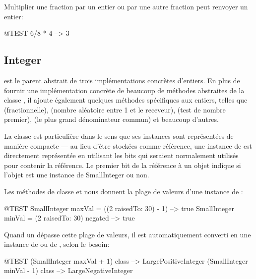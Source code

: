 \documentclass[a4paper,10pt,twoside]{book}
\begin{document}
Multiplier une fraction par un entier ou par une autre fraction peut renvoyer un entier:

\begin{code}{@TEST}
6/8 * 4 --> 3
\end{code}


\subsection{Integer}

 est le parent abstrait de trois implémentations
concrètes d'entiers. En plus de fournir une implémentation
concrète de beaucoup de méthodes abstraites de la classe
, il ajoute également quelques méthodes spécifiques
aux entiers, telles que 
(fractionnelle),
(nombre aléatoire entre 1 et le receveur),
(test de nombre premier), 
(le plus grand dénominateur commun)
et beaucoup d'autres.

La classe  est particulière dans le sens que ses instances sont représentées de manière compacte --- au lieu d'être stockées comme référence, une instance de  est directement représentée en utilisant les bits qui seraient normalement utilisés pour contenir la référence.  Le premier bit de la référence à un objet indique si l'objet est une instance de SmallInteger ou non.

Les méthodes de classe  et  nous donnent la plage de valeurs d'une instance de :

\begin{code}{@TEST}
SmallInteger maxVal = ((2 raisedTo: 30) - 1)      --> true
SmallInteger minVal = (2 raisedTo: 30) negated --> true
\end{code}

Quand un  dépasse cette plage de valeurs, il est automatiquement converti en une instance de  ou de , selon le besoin:

\begin{code}{@TEST}
(SmallInteger maxVal + 1) class --> LargePositiveInteger
(SmallInteger minVal - 1) class  --> LargeNegativeInteger
\end{code}
\end{document}
